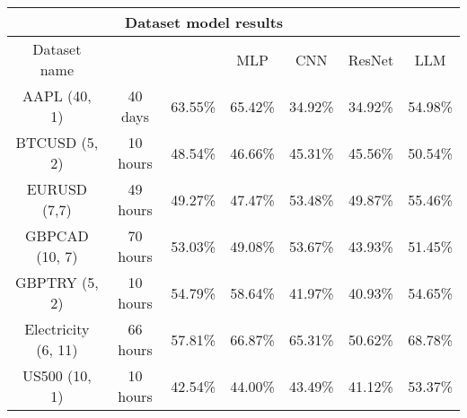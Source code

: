 \begin{center}
	\begin{tabular}{|| c || c | c | c | c | c | c ||}
		\hline
		\multicolumn{6}{|c|}{Dataset model results}                                                                                                                               \\
		\hline
		Dataset name        & \vtop{\hbox{\strut Prediction}\hbox{\strut timestep}} & \vtop{\hbox{\strut Linear}\hbox{\strut regression}} & MLP     & CNN     & ResNet  & LLM     \\ [0.5ex]
		\hline\hline
		AAPL (40, 1)        & 40 days                                               & 63.55\%                                             & 65.42\% & 34.92\% & 34.92\% & 54.98\% \\
		\hline
		BTCUSD (5, 2)       & 10 hours                                              & 48.54\%                                             & 46.66\% & 45.31\% & 45.56\% & 50.54\% \\
		\hline
		EURUSD (7,7)        & 49 hours                                              & 49.27\%                                             & 47.47\% & 53.48\% & 49.87\% & 55.46\% \\
		\hline
		GBPCAD (10, 7)      & 70 hours                                              & 53.03\%                                             & 49.08\% & 53.67\% & 43.93\% & 51.45\% \\
		\hline
		GBPTRY (5, 2)       & 10 hours                                              & 54.79\%                                             & 58.64\% & 41.97\% & 40.93\% & 54.65\% \\
		\hline
		Electricity (6, 11) & 66 hours                                              & 57.81\%                                             & 66.87\% & 65.31\% & 50.62\% & 68.78\% \\
		\hline
		US500 (10, 1)       & 10 hours                                              & 42.54\%                                             & 44.00\% & 43.49\% & 41.12\% & 53.37\% \\
		\hline

		\hline
	\end{tabular}
\end{center}

